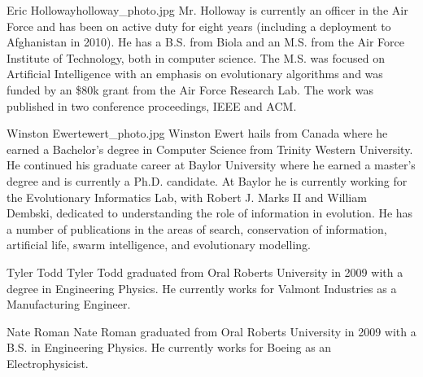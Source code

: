 \begin{authorbio}{Eric Holloway}{holloway_photo.jpg}{}
Mr. Holloway is currently an officer in the Air Force and has been on
active duty for eight years (including a deployment to Afghanistan in
2010). He has a B.S. from Biola and an M.S. from the Air Force Institute
of Technology, both in computer science. The M.S. was focused on Artificial Intelligence
with an emphasis on evolutionary algorithms and was funded by an \$80k
grant from the Air Force Research Lab. The work was published in
two conference proceedings, IEEE and ACM.
\end{authorbio}

\begin{authorbio}{Winston Ewert}{ewert_photo.jpg}{}
Winston Ewert hails from Canada where he earned a Bachelor's degree in Computer Science from Trinity Western University. He continued his graduate career at Baylor University where he earned a master's degree and is currently a Ph.D. candidate. At Baylor he is currently working for the Evolutionary Informatics Lab, with Robert J. Marks II and William Dembski, dedicated to understanding the role of information in evolution. He has a number of publications in the areas of search, conservation of information, artificial life, swarm intelligence, and evolutionary modelling. 
\end{authorbio}

\begin{authorbio}{Tyler Todd}{}{}
Tyler Todd graduated from Oral Roberts University in 2009 with a degree in Engineering Physics.  He currently works for Valmont Industries as a Manufacturing Engineer.
\end{authorbio}

\begin{authorbio}{Nate Roman}{}{}
Nate Roman graduated from Oral Roberts University in 2009 with a B.S. in Engineering Physics.  He currently works for Boeing as an Electrophysicist.
\end{authorbio}

